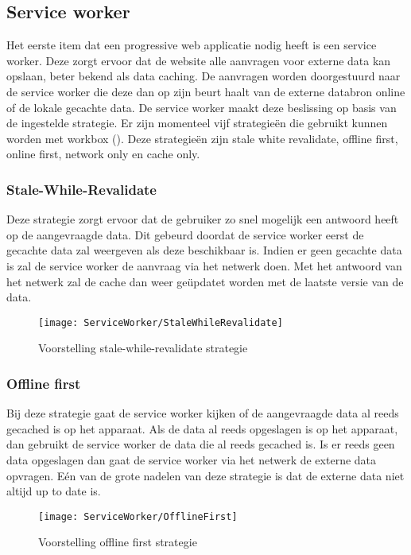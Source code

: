 \subsection{Service worker}
Het eerste item dat een progressive web applicatie nodig heeft is een service worker. Deze zorgt ervoor dat de website alle aanvragen voor externe data kan opslaan, beter bekend als data caching. De aanvragen worden doorgestuurd naar de service worker die deze dan op zijn beurt haalt van de externe databron online of de lokale gecachte data. De service worker maakt deze beslissing op basis van de ingestelde strategie. Er zijn momenteel vijf strategieën die gebruikt kunnen worden met workbox (\cite{WORKBOX_STRATEGIES}). Deze strategieën zijn stale white revalidate, offline first, online first, network only en cache only.

\subsubsection{Stale-While-Revalidate}
Deze strategie zorgt ervoor dat de gebruiker zo snel mogelijk een antwoord heeft op de aangevraagde data. Dit gebeurd doordat de service worker eerst de gecachte data zal weergeven als deze beschikbaar is. Indien er geen gecachte data is zal de service worker de aanvraag via het netwerk doen. Met het antwoord van het netwerk zal de cache dan weer geüpdatet worden met de laatste versie van de data.

\begin{figure}[!h]
	\texttt{[image: ServiceWorker/StaleWhileRevalidate]}\centering
	\caption{Voorstelling stale-while-revalidate strategie}
\end{figure}

\subsubsection{Offline first}
Bij deze strategie gaat de service worker kijken of de aangevraagde data al reeds gecached is op het apparaat. Als de data al reeds opgeslagen is op het apparaat, dan gebruikt de service worker de data die al reeds gecached is. Is er reeds geen data opgeslagen dan gaat de service worker via het netwerk de externe data opvragen. Eén van de grote nadelen van deze strategie is dat de externe data niet altijd up to date is.

\begin{figure}[!h]
	\texttt{[image: ServiceWorker/OfflineFirst]}\centering
	\caption{Voorstelling offline first strategie}
\end{figure}

